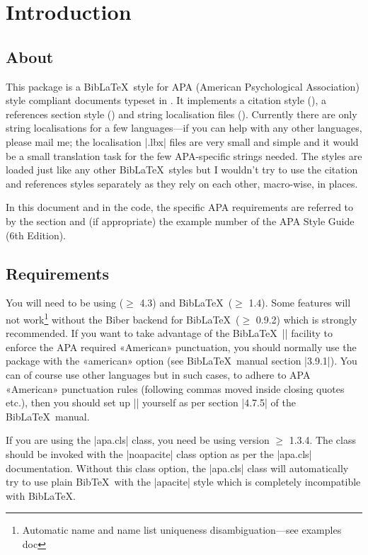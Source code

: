 \documentclass{ltxdockit}
\begin{document}
\printtitlepage
\tableofcontents

\section{Introduction}
\label{int}

\subsection{About}

This package is a Bib\LaTeX\ style for APA (American Psychological
Association) style compliant documents typeset in \latex. It implements a
citation style (), a references section style
() and string localisation files ().
Currently there are only string localisations for a few languages---if you can help with any other languages, please mail me; the
localisation |.lbx| files are very small and simple and it would be a small
translation task for the few APA-specific strings needed.
The styles are loaded just like any other Bib\LaTeX\ styles but I
wouldn't try to use the citation and references styles separately as they
rely on each other, macro-wise, in places.

In this document and in the code, the specific APA requirements are
referred to by the section and (if appropriate) the example number of the
APA Style Guide (6th Edition).

\subsection{Requirements}\label{ref:req}

You will need to be using  ($\geq$ 4.3) and Bib\LaTeX\
($\geq$ 1.4). Some features will not work\footnote{Automatic name and name
  list uniqueness disambiguation---see examples doc} without the
Biber backend for Bib\LaTeX\ ($\geq$ 0.9.2) which is strongly
recommended. If you want to take advantage of the Bib\LaTeX\
|\DeclareQuotePunctuation| facility to enforce the APA required «American»
punctuation, you should normally use the \sty{babel} package with the
«american» option (see Bib\LaTeX\ manual section |3.9.1|). You can of
course use other languages but in such cases, to adhere to APA «American»
punctuation rules (following commas moved inside closing quotes etc.), then
you should set up |\DeclareQuotePunctuation| yourself as per section
|4.7.5| of the Bib\LaTeX\ manual.

If you are using the |apa.cls| \latex class, you need be using version
$\geq$ 1.3.4. The class should be invoked with the |noapacite| class option
as per the |apa.cls| documentation. Without this class option, the
|apa.cls| class will automatically try to use plain Bib\TeX\ with the
|apacite| style which is completely incompatible with Bib\LaTeX.
\end{document}
